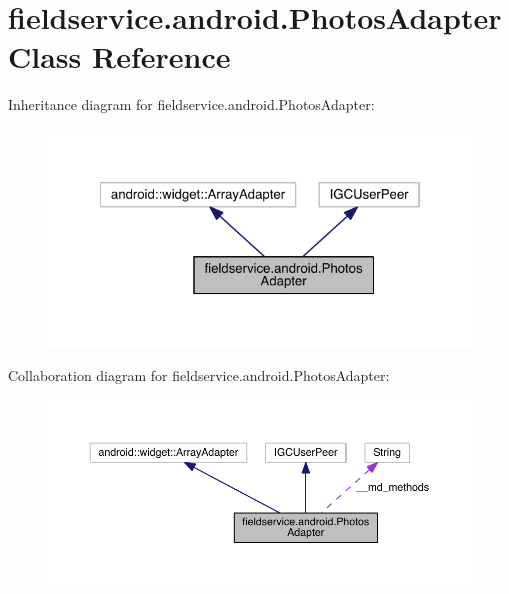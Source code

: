 \hypertarget{classfieldservice_1_1android_1_1_photos_adapter}{\section{fieldservice.\+android.\+Photos\+Adapter Class Reference}
\label{classfieldservice_1_1android_1_1_photos_adapter}
}


Inheritance diagram for fieldservice.\+android.\+Photos\+Adapter\+:
\nopagebreak
\begin{figure}[H]
\begin{center}
\leavevmode
\includegraphics[width=322pt]{classfieldservice_1_1android_1_1_photos_adapter__inherit__graph}
\end{center}
\end{figure}


Collaboration diagram for fieldservice.\+android.\+Photos\+Adapter\+:
\nopagebreak
\begin{figure}[H]
\begin{center}
\leavevmode
\includegraphics[width=350pt]{classfieldservice_1_1android_1_1_photos_adapter__coll__graph}
\end{center}
\end{figure}
